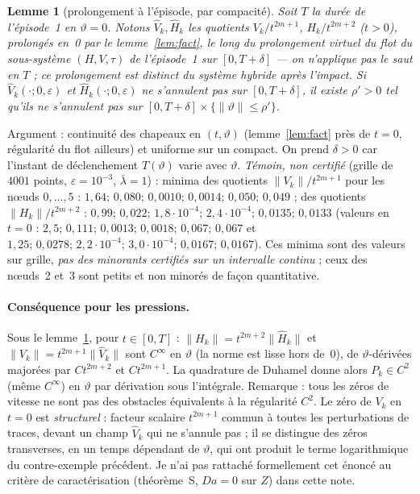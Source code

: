 \documentclass[11pt,a4paper]{article}
\newtheorem{lemme}{Lemme}
\theoremstyle{remark}
\newcommand{\vth}{\vartheta}
\begin{document}
\begin{lemme}[prolongement \`a l'\'episode, par compacit\'e]\label{lem:comp}
Soit $T$ la dur\'ee de l'\'episode~1 en $\vth=0$. Notons $\hat V_k,\hat H_k$ les quotients $V_k/t^{2m+1}$, $H_k/t^{2m+2}$ ($t>0$), prolong\'es en~0 par le lemme~\ref{lem:fact}, le long du \emph{prolongement virtuel} du flot du sous-syst\`eme $(H,V,\tau)$ de l'\'episode~1 sur $[0,T+\delta]$ --- on n'applique pas le saut en $T$ ; ce prolongement est distinct du syst\`eme hybride apr\`es l'impact. Si $\hat V_k(\cdot;0,\varepsilon)$ et $\hat H_k(\cdot;0,\varepsilon)$ ne s'annulent pas sur $[0,T+\delta]$, il existe $\rho'>0$ tel qu'ils ne s'annulent pas sur $[0,T+\delta]\times\{\lVert\vth\rVert\le\rho'\}$.
\end{lemme}
\noindent Argument : continuit\'e des chapeaux en $(t,\vth)$ (lemme~\ref{lem:fact} pr\`es de $t=0$, r\'egularit\'e du flot ailleurs) et uniforme sur un compact. On prend $\delta>0$ car l'instant de d\'eclenchement $T(\vth)$ varie avec $\vth$.
\emph{T\'emoin, non certifi\'e} (grille de $4001$ points, $\varepsilon=10^{-3}$, $\bar\lambda=1$) : minima des quotients $\lVert V_k\rVert/t^{2m+1}$ pour les n\oe uds $0,\dots,5$ : $1{,}64;\,0{,}080;\,0{,}0010;\,0{,}0014;\,0{,}050;\,0{,}049$ ; des quotients $\lVert H_k\rVert/t^{2m+2}$ : $0{,}99;\,0{,}022;\,1{,}8\!\cdot\!10^{-4};\,2{,}4\!\cdot\!10^{-4};\,0{,}0135;\,0{,}0133$ (valeurs en $t=0$ : $2{,}5;\,0{,}111;\,0{,}0013;\,0{,}0018;\,0{,}067;\,0{,}067$ et $1{,}25;\,0{,}0278;\,2{,}2\!\cdot\!10^{-4};\,3{,}0\!\cdot\!10^{-4};\,0{,}0167;\,0{,}0167$). Ces minima sont des valeurs sur grille, \emph{pas des minorants certifi\'es sur un intervalle continu} ; ceux des n\oe uds~2 et~3 sont petits et non minor\'es de fa\c{c}on quantitative.

\paragraph{Cons\'equence pour les pressions.} Sous le lemme~\ref{lem:comp}, pour $t\in[0,T]$ : $\lVert H_k\rVert=t^{2m+2}\lVert\hat H_k\rVert$ et $\lVert V_k\rVert=t^{2m+1}\lVert\hat V_k\rVert$ sont $C^\infty$ en $\vth$ (la norme est lisse hors de~0), de $\vth$-d\'eriv\'ees major\'ees par $Ct^{2m+2}$ et $Ct^{2m+1}$. La quadrature de Duhamel donne alors $P_k\in C^2$ (m\^eme $C^\infty$) en $\vth$ par d\'erivation sous l'int\'egrale. Remarque : tous les z\'eros de vitesse ne sont pas des obstacles \'equivalents \`a la r\'egularit\'e $C^2$. Le z\'ero de $V_k$ en $t=0$ est \emph{structurel} : facteur scalaire $t^{2m+1}$ commun \`a toutes les perturbations de traces, devant un champ $\hat V_k$ qui ne s'annule pas ; il se distingue des z\'eros transverses, en un temps d\'ependant de $\vth$, qui ont produit le terme logarithmique du contre-exemple pr\'ec\'edent. Je n'ai pas rattach\'e formellement cet \'enonc\'e au crit\`ere de caract\'erisation (th\'eor\`eme~S, $Da=0$ sur $Z$) dans cette note.
\end{document}
